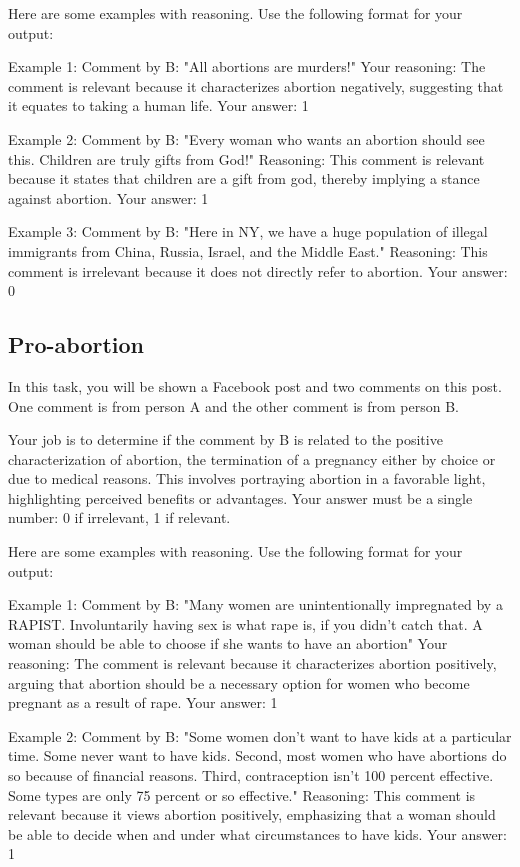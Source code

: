 Here are some examples with reasoning. Use the following format for your output:

Example 1:
Comment by B: "All abortions are murders!"
Your reasoning: The comment is relevant because it characterizes abortion negatively, suggesting that it equates to taking a human life. 
Your answer: 1

Example 2:
Comment by B: "Every woman who wants an abortion should see this. Children are truly gifts from God!"
Reasoning: This comment is relevant because it states that children are a gift from god, thereby implying a stance against abortion.
Your answer: 1

Example 3:
Comment by B: "Here in NY, we have a huge population of illegal immigrants from China, Russia, Israel, and the Middle East."
Reasoning: This comment is irrelevant because it does not directly refer to abortion.
Your answer: 0

\subsection{Pro-abortion}

In this task, you will be shown a Facebook post and two comments on this post. One comment is from person A and the other comment is from person B. 

Your job is to determine if the comment by B is related to the positive characterization of abortion, the termination of a pregnancy either by choice or due to medical reasons. This involves portraying abortion in a favorable light, highlighting perceived benefits or advantages.
Your answer must be a single number: 0 if irrelevant, 1 if relevant.

Here are some examples with reasoning. Use the following format for your output:

Example 1:
Comment by B: "Many women are unintentionally impregnated by a RAPIST. Involuntarily having sex is what rape is, if you didn't catch that. A woman should be able to choose if she wants to have an abortion"
Your reasoning: The comment is relevant because it characterizes abortion positively, arguing that abortion should be a necessary option for women who become pregnant as a result of rape. 
Your answer: 1

Example 2:
Comment by B: "Some women don't want to have kids at a particular time. Some never want to have kids. Second, most women who have abortions do so because of financial reasons. Third, contraception isn't 100 percent effective. Some types are only 75 percent or so effective."
Reasoning: This comment is relevant because it views abortion positively, emphasizing that a woman should be able to decide when and under what circumstances to have kids.
Your answer: 1

